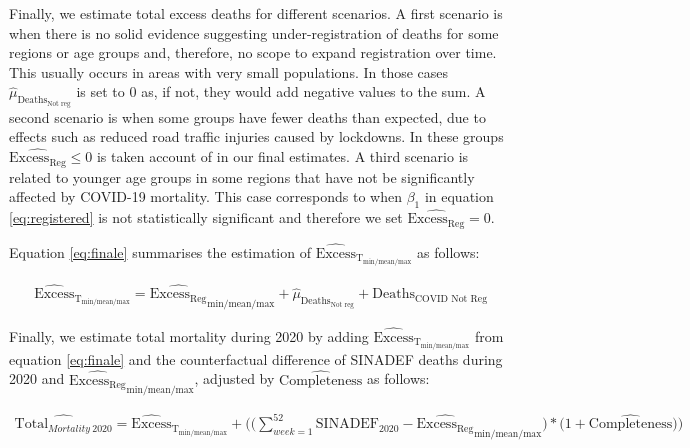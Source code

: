 \documentclass[
]{article}
\begin{document}
Finally, we estimate total excess deaths for different scenarios. A first scenario is when there is no solid evidence suggesting under-registration of deaths for some regions or age groups and, therefore, no scope to expand registration over time. This usually occurs in areas with very small populations. In those cases \(\widehat{\mu}_{\text{Deaths}_\text{Not reg}}\) is set to 0 as, if not, they would add negative values to the sum. A second scenario is when some groups have fewer deaths than expected, due to effects such as reduced road traffic injuries caused by lockdowns. In these groups \(\widehat{{\text{Excess}}_\text{Reg}}\le 0\) is taken account of in our final estimates. A third scenario is related to younger age groups in some regions that have not be significantly affected by COVID-19 mortality. This case corresponds to when \({\beta_{1}}\) in equation \eqref{eq:registered} is not statistically significant and therefore we set \(\widehat{{\text{Excess}}_\text{Reg}} = 0\).

Equation \eqref{eq:finale} summarises the estimation of \(\widehat{\text{Excess}}_{\text{T}_{\text{min/mean/max}}}\) as follows:

\begin{equation}
\label{eq:finale}
  \begin{aligned}
    \widehat{\text{Excess}}_{\text{T}_{\text{min/mean/max}}} =
      \widehat{{\text{Excess}}_\text{Reg}}_{\text{min/mean/max}}  +   
        \widehat{\mu}_{\text{Deaths}_\text{Not reg}}
         +{\text{Deaths}_\text{COVID Not Reg}} 
  \end{aligned}
\end{equation}

Finally, we estimate total mortality during 2020 by adding \(\widehat{\text{Excess}}_{\text{T}_{\text{min/mean/max}}}\) from equation \eqref{eq:finale} and the counterfactual difference of SINADEF deaths during 2020 and \(\widehat{{\text{Excess}}_\text{Reg}}_{\text{min/mean/max}}\), adjusted by \(\widehat{\text{Completeness}}\) as follows:

\begin{equation}
\label{eq:totalmort}
        \begin{aligned}
    \widehat{\text{Total}_{Mortality \ 2020}}=\widehat{\text{Excess}}_{\text{T}_{\text{min/mean/max}}}+\Big(\big(\sum\limits_{week=1}^{52}\text{SINADEF}_{2020}-
    \widehat{{\text{Excess}}_\text{Reg}}_{\text{min/mean/max}}\big)*\big(1+\widehat{\text{Completeness}}\big)\Big)
    \end{aligned} 
\end{equation}
\end{document}
